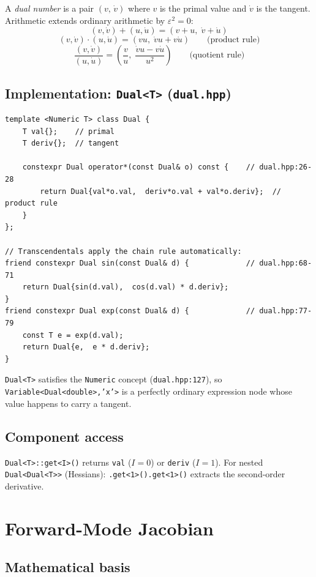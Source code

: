 \documentclass[11pt,a4paper]{article}
\newcommand{\code}[1]{\texttt{#1}}
\begin{document}
A \emph{dual number} is a pair $(v,\,\dot{v})$ where $v$ is the primal value
and $\dot{v}$ is the tangent.  Arithmetic extends ordinary arithmetic by
$\varepsilon^2 = 0$:
\[
  (v,\dot v)+(u,\dot u) = (v+u,\;\dot v+\dot u)
\]
\[
  (v,\dot v)\cdot(u,\dot u) = (vu,\;\dot{v}u+v\dot{u})
  \qquad\text{(product rule)}
\]
\[
  \frac{(v,\dot v)}{(u,\dot u)} = \left(\frac{v}{u},\;\frac{\dot{v}u-v\dot{u}}{u^2}\right)
  \qquad\text{(quotient rule)}
\]

\subsection{Implementation: \texttt{Dual<T>} (\texttt{dual.hpp})}

\begin{lstlisting}
template <Numeric T> class Dual {
    T val{};    // primal
    T deriv{};  // tangent

    constexpr Dual operator*(const Dual& o) const {    // dual.hpp:26-28
        return Dual{val*o.val,  deriv*o.val + val*o.deriv};  // product rule
    }
};

// Transcendentals apply the chain rule automatically:
friend constexpr Dual sin(const Dual& d) {             // dual.hpp:68-71
    return Dual{sin(d.val),  cos(d.val) * d.deriv};
}
friend constexpr Dual exp(const Dual& d) {             // dual.hpp:77-79
    const T e = exp(d.val);
    return Dual{e,  e * d.deriv};
}
\end{lstlisting}

\code{Dual<T>} satisfies the \code{Numeric} concept (\texttt{dual.hpp:127}),
so \code{Variable<Dual<double>,'x'>} is a perfectly ordinary expression node
whose value happens to carry a tangent.

\subsection{Component access}

\code{Dual<T>::get<I>()} returns \code{val} ($I=0$) or \code{deriv} ($I=1$).
For nested \code{Dual<Dual<T>>} (Hessians):
\code{.get<1>().get<1>()} extracts the second-order derivative.

\section{Forward-Mode Jacobian}
\label{sec:fwdmode}

\subsection{Mathematical basis}
\end{document}
